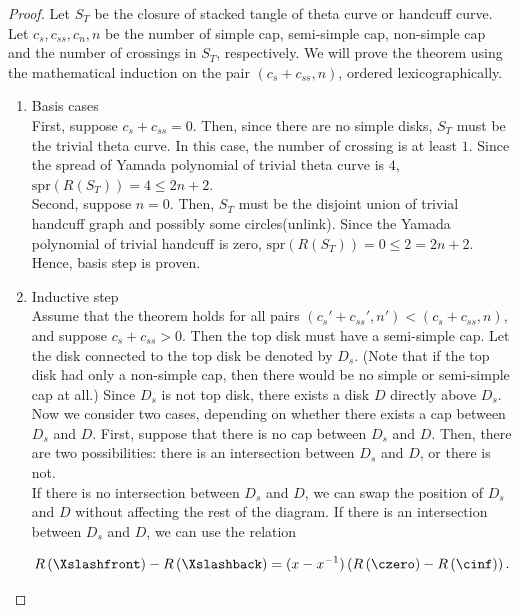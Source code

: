 \documentclass{article}
\theoremstyle{definition}
\theoremstyle{theorem}
\theoremstyle{proposition}
\theoremstyle{corollary}
\begin{document}
\begin{proof}
    Let $S_T$ be the closure of stacked tangle of theta curve or handcuff curve. Let $c_s, c_{ss}, c_n, n$ be the number of simple cap, semi-simple cap, non-simple cap and the number of crossings in $S_T$, respectively. We will prove the theorem using the mathematical induction on the pair $(c_s+c_{ss}, n)$, ordered lexicographically.
    \begin{enumerate}
        \item Basis cases \\
        First, suppose $c_s + c_{ss} = 0$. Then, since there are no simple disks, $S_T$ must be the trivial theta curve. In this case, the number of crossing is at least $1$. Since the spread of Yamada polynomial of trivial theta curve is $4$, $\mathrm{spr}(R(S_T)) = 4 \leq 2n+2$. \\
        Second, suppose $n = 0$. Then, $S_T$ must be the disjoint union of trivial handcuff graph and possibly some circles(unlink). Since the Yamada polynomial of trivial handcuff is zero, $\mathrm{spr}(R(S_T)) = 0 \leq 2 = 2n+2$. \\
        Hence, basis step is proven.
        
        \item Inductive step \\
        Assume that the theorem holds for all pairs $(c_s' + c_{ss}', n') < (c_s + c_{ss}, n)$, and suppose $c_s+c_{ss} > 0$. Then the top disk must have a semi-simple cap. Let the disk connected to the top disk be denoted by $D_s$. (Note that if the top disk had only a non-simple cap, then there would be no simple or semi-simple cap at all.) Since $D_s$ is not top disk, there exists a disk $D$ directly above $D_s$. Now we consider two cases, depending on whether there exists a cap between $D_s$ and $D$. First, suppose that there is no cap between $D_s$ and $D$. Then, there are two possibilities: there is an intersection between $D_s$ and $D$, or there is not. \\
        If there is no intersection between $D_s$ and $D$, we can swap the position of $D_s$ and $D$ without affecting the rest of the diagram. If there is an intersection between $D_s$ and $D$, we can use the relation

        \[ R \left( \Xslashfront \right) - R \left( \Xslashback \right) = (x - x^{-1}) \left( R \left( \czero \right) - R \left ( \cinf \right) \right). \]


\end{enumerate}
\end{proof}
\end{document}
